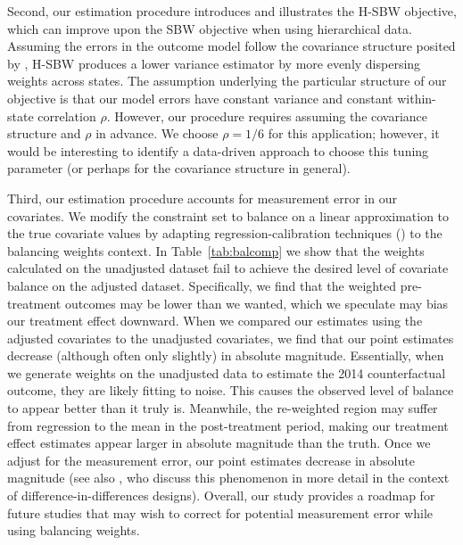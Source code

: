 \documentclass[article]{imsart}
\theoremstyle{plain}
\theoremstyle{remark}
\begin{document}
Second, our estimation procedure introduces and illustrates the H-SBW objective, which can improve upon the SBW objective when using hierarchical data. Assuming the errors in the outcome model follow the covariance structure posited by \cite{kloek1981ols}, H-SBW produces a lower variance estimator by more evenly dispersing weights across states. The assumption underlying the particular structure of our objective is that our model errors have constant variance and constant within-state correlation $\rho$. However, our procedure requires assuming the covariance structure and $\rho$ in advance. We choose $\rho = 1/6$ for this application; however, it would be interesting to identify a data-driven approach to choose this tuning parameter (or perhaps for the covariance structure in general). 

Third, our estimation procedure accounts for measurement error in our covariates. We modify the constraint set to balance on a linear approximation to the true covariate values by adapting regression-calibration techniques (\cite{gleser1992importance}) to the balancing weights context. In Table~\ref{tab:balcomp} we show that the weights calculated on the unadjusted dataset fail to achieve the desired level of covariate balance on the adjusted dataset. Specifically, we find that the weighted pre-treatment outcomes may be lower than we wanted, which we speculate may bias our treatment effect downward. When we compared our estimates using the adjusted covariates to the unadjusted covariates, we find that our point estimates decrease (although often only slightly) in absolute magnitude. Essentially, when we generate weights on the unadjusted data to estimate the 2014 counterfactual outcome, they are likely fitting to noise. This causes the observed level of balance to appear better than it truly is. Meanwhile, the re-weighted region may suffer from regression to the mean in the post-treatment period, making our treatment effect estimates appear larger in absolute magnitude than the truth. Once we adjust for the measurement error, our point estimates decrease in absolute magnitude (see also \cite{daw2018matching}, who discuss this phenomenon in more detail in the context of difference-in-differences designs). Overall, our study provides a roadmap for future studies that may wish to correct for potential measurement error while using balancing weights. 
\end{document}
